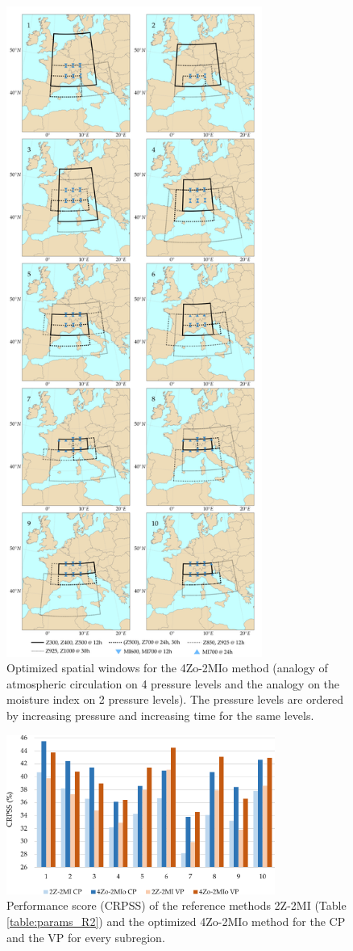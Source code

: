 \documentclass[review]{elsarticle}
\begin{document}
\begin{figure}[t]
	\centerline{\includegraphics[width=8.4cm]{figures/fig05.pdf}}
	\caption{Optimized spatial windows for the 4Zo-2MIo method (analogy of atmospheric circulation on 4 pressure levels and the analogy on the moisture index on 2 pressure levels). The pressure levels are ordered by increasing pressure and increasing time for the same levels.}
	\label{fig:spatial_windows_4Zo-2MIo}
\end{figure}

\begin{figure}[t]
	\centerline{\includegraphics[width=8.8cm]{figures/fig06.pdf}}
	\caption{Performance score (CRPSS) of the reference methods 2Z-2MI (Table \ref{table:params_R2}) and the optimized 4Zo-2MIo method for the CP and the VP for every subregion.}
	\label{fig:figure_crpss_4Zo-2HIo}
\end{figure}
\end{document}
